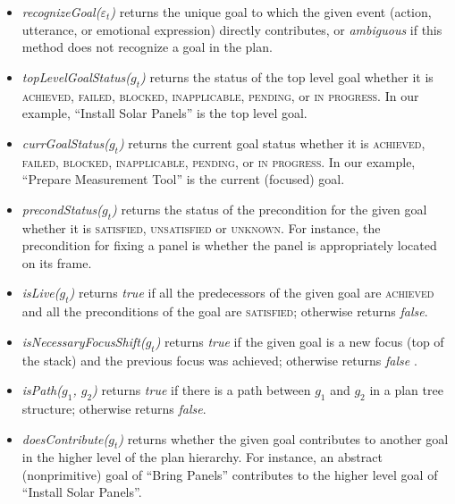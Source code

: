 \documentclass{aamas2016}
\begin{document}
\begin{itemize}[leftmargin=2pt]
  \setlength\itemsep{0.2mm}
  \item \textit{recognizeGoal($\varepsilon_t$)} returns the unique goal to which
  the given event (action, utterance, or emotional expression) directly
  contributes, or \textit{ambiguous} if this method does not recognize a goal in
  the plan.
  
  \item \textit{topLevelGoalStatus($g_t$)} returns the status of the top level
  goal whether it is \textsc{achieved, failed, blocked, inapplicable, pending,}
  or \textsc{in progress}.
  In our example, ``Install Solar Panels'' is the top level goal.
  
  \item \textit{currGoalStatus($g_t$)} returns the current goal status whe\-ther
  it is \textsc{achieved, failed, blocked, inapplicable, pending,} or \textsc{in
  progress}. In our example, ``Prepare Measurement Tool'' is the current
  (focused) goal.
  
  \item \textit{precondStatus($g_t$)} returns the status of the precondition for
  the given goal whether it is \textsc{satisfied, unsatisfied} or
  \textsc{unknown}. For instance, the precondition for fixing a panel is whether
  the panel is appropriately located on its frame.
  
  \item \textit{isLive($g_t$)} returns \textit{true} if all the predecessors of
  the given goal are \textsc{achieved} and all the preconditions of the goal are
  \textsc{satisfied}; otherwise returns \textit{false}.
  
  \item \textit{isNecessaryFocusShift($g_t$)} returns \textit{true} if the given
  goal is a new focus (top of the stack) and the previous focus was achieved;
  otherwise returns \textit{false} \cite{rich:focused-unfocused-users}.
  
  \item \textit{isPath($g_1$, $g_2$)} returns \textit{true} if there is a path
  between $g_1$ and $g_2$ in a plan tree structure; otherwise returns
  \textit{false}.
  
  \item \textit{doesContribute($g_t$)} returns whether the given goal
  contributes to another goal in the higher level of the plan hierarchy. For
  instance, an abstract (nonprimitive) goal of ``Bring Panels'' contributes to
  the higher level goal of ``Install Solar Panels''.
  

\end{itemize}
\end{document}
